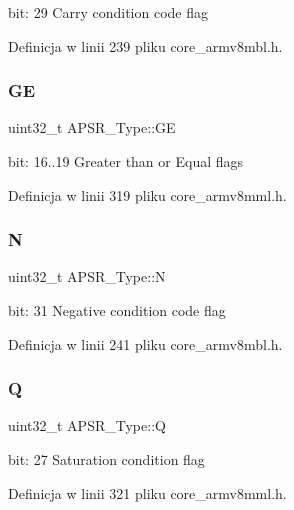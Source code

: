 bit\+: 29 Carry condition code flag 

Definicja w linii 239 pliku core\+\_\+armv8mbl.\+h.

\mbox{\label{union_a_p_s_r___type_adcb98a5b9c93b0cb69cdb7af5638f32e}} 
\subsubsection{\texorpdfstring{GE}{GE}}
{\footnotesize\ttfamily uint32\+\_\+t A\+P\+S\+R\+\_\+\+Type\+::\+GE}

bit\+: 16..19 Greater than or Equal flags 

Definicja w linii 319 pliku core\+\_\+armv8mml.\+h.

\mbox{\label{union_a_p_s_r___type_a7e7bbba9b00b0bb3283dc07f1abe37e0}} 
\subsubsection{\texorpdfstring{N}{N}}
{\footnotesize\ttfamily uint32\+\_\+t A\+P\+S\+R\+\_\+\+Type\+::N}

bit\+: 31 Negative condition code flag 

Definicja w linii 241 pliku core\+\_\+armv8mbl.\+h.

\mbox{\label{union_a_p_s_r___type_a22d10913489d24ab08bd83457daa88de}} 
\subsubsection{\texorpdfstring{Q}{Q}}
{\footnotesize\ttfamily uint32\+\_\+t A\+P\+S\+R\+\_\+\+Type\+::Q}

bit\+: 27 Saturation condition flag 

Definicja w linii 321 pliku core\+\_\+armv8mml.\+h.

\mbox{\label{union_a_p_s_r___type_a8004d224aacb78ca37774c35f9156e7e}} 
